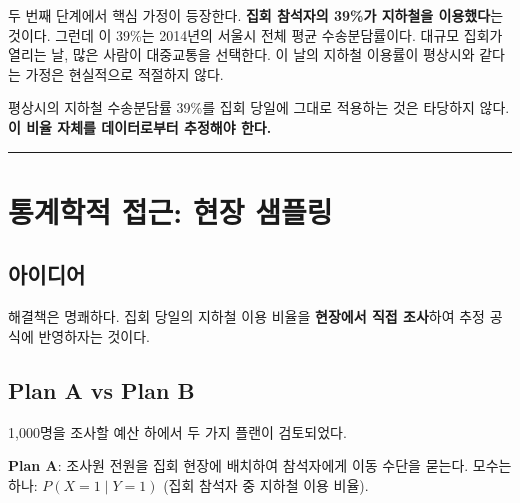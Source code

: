 \documentclass[
  letterpaper,
  DIV=11,
  numbers=noendperiod]{scrreprt}
\begin{document}
두 번째 단계에서 핵심 가정이 등장한다. \textbf{집회 참석자의 39\%가
지하철을 이용했다}는 것이다. 그런데 이 39\%는 2014년의 서울시 전체 평균
수송분담률이다. 대규모 집회가 열리는 날, 많은 사람이 대중교통을
선택한다. 이 날의 지하철 이용률이 평상시와 같다는 가정은 현실적으로
적절하지 않다.

\begin{tcolorbox}[enhanced jigsaw, arc=.35mm, bottomrule=.15mm, bottomtitle=1mm, breakable, colback=white, colbacktitle=quarto-callout-important-color!10!white, colframe=quarto-callout-important-color-frame, coltitle=black, left=2mm, leftrule=.75mm, opacityback=0, opacitybacktitle=0.6, rightrule=.15mm, title=\textcolor{quarto-callout-important-color}{\faExclamation}\hspace{0.5em}{핵심 문제}, titlerule=0mm, toprule=.15mm, toptitle=1mm]

평상시의 지하철 수송분담률 39\%를 집회 당일에 그대로 적용하는 것은
타당하지 않다. \textbf{이 비율 자체를 데이터로부터 추정해야 한다.}

\end{tcolorbox}

\begin{center}\rule{0.5\linewidth}{0.5pt}\end{center}

\section{통계학적 접근: 현장
샘플링}\label{uxd1b5uxacc4uxd559uxc801-uxc811uxadfc-uxd604uxc7a5-uxc0d8uxd50cuxb9c1}

\subsection{아이디어}\label{uxc544uxc774uxb514uxc5b4}

해결책은 명쾌하다. 집회 당일의 지하철 이용 비율을 \textbf{현장에서 직접
조사}하여 추정 공식에 반영하자는 것이다.

\subsection{Plan A vs Plan B}\label{plan-a-vs-plan-b}

1,000명을 조사할 예산 하에서 두 가지 플랜이 검토되었다.

\textbf{Plan A}: 조사원 전원을 집회 현장에 배치하여 참석자에게 이동
수단을 묻는다. 모수는 하나: \(P(X=1 \mid Y=1)\) (집회 참석자 중 지하철
이용 비율).
\end{document}
